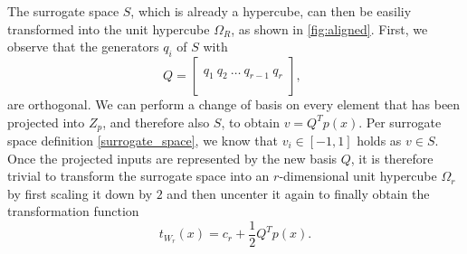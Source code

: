 \documentclass[
  a4paper,  %
  twoside,  %
  bibliography=totoc,
  headsepline,
  cleardoublepage=empty,
  parskip=half,
  draft=false
]{scrbook}
\begin{document}
The surrogate space $S$, which is already a hypercube, can then be easiliy transformed into the unit hypercube $\Omega_R$, as shown in \cref{fig:aligned}.
First, we observe that the generators $q_i$ of $S$ with
\begin{equation}
Q=\begin{bmatrix}
  \\
    q_1 ~ q_2 ~ \dots ~q_{r-1} ~ q_r\\
    \\
  \end{bmatrix}
  , ~~
\label{alignment}
\end{equation}
are orthogonal.
We can perform a change of basis on every element that has been projected into $Z_p$, and therefore also $S$, to obtain $v=Q^T p(x)$.
Per surrogate space definition \cref{surrogate_space}, we know that $v_i \in [-1,1]$ holds as $v \in S$.
Once the projected inputs are represented by the new basis $Q$, it is therefore trivial to transform the surrogate space into an $r$-dimensional unit hypercube $\Omega_r$ by first scaling it down by $2$ and then uncenter it again to finally obtain the transformation function
\begin{equation}
t_{W_r}(x)= c_r + \frac{1}{2} Q^T p(x).
\label{linear_trans}
\end{equation}
\end{document}
